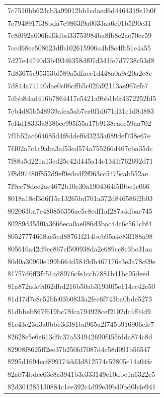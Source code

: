 \begin{tabular}{l}
7c7510bb623cb3a99012bb1cdaed6d4464319e1b0f \\
7c7948917f38bda7c9863f9a0033aa6e01b5f90c31 \\
7c8f092a606fa33dbd33753984ba8fb8c2ae70cc59 \\
7ced68ee508623dfb102615906a4bf8c4fb51e4a55 \\
7d27e44740d3b49346358df07d341fe7d7738c53d8 \\
7d83675c95353bf589a5dfaec1d448a0a9c20a2e8c \\
7d844a74140dae0c06cffb5c02fa92113ae967efe7 \\
7dbb8dad416b7864417e5421a9bb1b6f4372252fd5 \\
7eb4d85b548939afea5ab7ec0f1d671d31e1d8d883 \\
7ef4d18333a8386ce995f55a17b9138eaec59aa702 \\
7f1b52ac664685d4f8ddef6d3233a089def738e67e \\
7f402a7c1c9aba3af53cd574a755266d467cba35dc \\
7f88a5d221a13cd25c42d445a14c1341f762692d71 \\
7f8d97480f852d9ef9edcdf2f963cc5475cab552ae \\
7f9cc78dec2ae4672b10c30a1904364f5f0be1c066 \\
8018a18ef3d6f15c13265bd701a372d846586f2b03 \\
802063ba7e480856356ae5c8edf1af287a4dbae745 \\
80289d353f0a3666eca0ae086d3bac44c6c561cbf4 \\
80527774668ae5cd88761f214bcb95a4e83f188a98 \\
805616a42d9ec867cf500938da2e689cc8c3bc31aa \\
80d0a30900e199b664d5849db467176e3e3a78c09e \\
81757d6ff3fc51ad8976cfe4ccb7881b41bc95deed \\
81a872ade9d62dbd216b50ab31930f5e114ec42c50 \\
81d17d7c8c52bfc03b0833a2fec6f743ba0bde5273 \\
81dbbeb867f619bc78fca794928cef2102dc4f04d9 \\
81e43e23d3a0bbc3d381bd965a2f745b916906cfe7 \\
82628e5e6e613d9c37a534942690f455fdda874c8d \\
82908f8625ff2ee37b250fd7087d4c58d091b56547 \\
8295d1694ecf899174dd3d812574c52805c14a04fc \\
82a074bdee63c8a3941b3c333149c10dbe1a6322e5 \\
82d301285130884c1ee392c4d99e39b40bd0b4e941 \\

\end{tabular}
